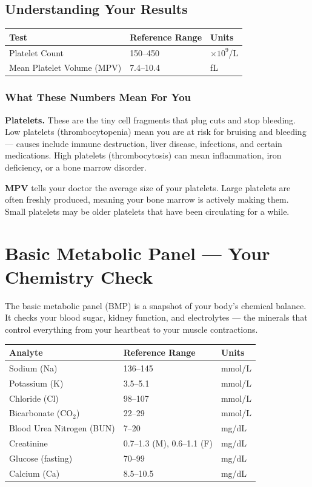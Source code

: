 \subsection{Understanding Your Results}

\begin{longtable}{@{}lll@{}}
\toprule
\textbf{Test} & \textbf{Reference Range} & \textbf{Units} \\
\midrule
Platelet Count & 150--450 & $\times 10^9$/L \\
Mean Platelet Volume (MPV) & 7.4--10.4 & fL \\
\bottomrule
\end{longtable}

\subsubsection{What These Numbers Mean For You}

\textbf{Platelets.} These are the tiny cell fragments that plug cuts and stop bleeding. Low platelets (thrombocytopenia) mean you are at risk for bruising and bleeding --- causes include immune destruction, liver disease, infections, and certain medications. High platelets (thrombocytosis) can mean inflammation, iron deficiency, or a bone marrow disorder.

\textbf{MPV} tells your doctor the average size of your platelets. Large platelets are often freshly produced, meaning your bone marrow is actively making them. Small platelets may be older platelets that have been circulating for a while.

\clearpage
\section{Basic Metabolic Panel --- Your Chemistry Check}

The basic metabolic panel (BMP) is a snapshot of your body's chemical balance. It checks your blood sugar, kidney function, and electrolytes --- the minerals that control everything from your heartbeat to your muscle contractions.

\begin{longtable}{@{}lll@{}}
\toprule
\textbf{Analyte} & \textbf{Reference Range} & \textbf{Units} \\
\midrule
Sodium (Na) & 136--145 & mmol/L \\
Potassium (K) & 3.5--5.1 & mmol/L \\
Chloride (Cl) & 98--107 & mmol/L \\
Bicarbonate (CO$_2$) & 22--29 & mmol/L \\
Blood Urea Nitrogen (BUN) & 7--20 & mg/dL \\
Creatinine & 0.7--1.3 (M), 0.6--1.1 (F) & mg/dL \\
Glucose (fasting) & 70--99 & mg/dL \\
Calcium (Ca) & 8.5--10.5 & mg/dL \\
\bottomrule
\end{longtable}

